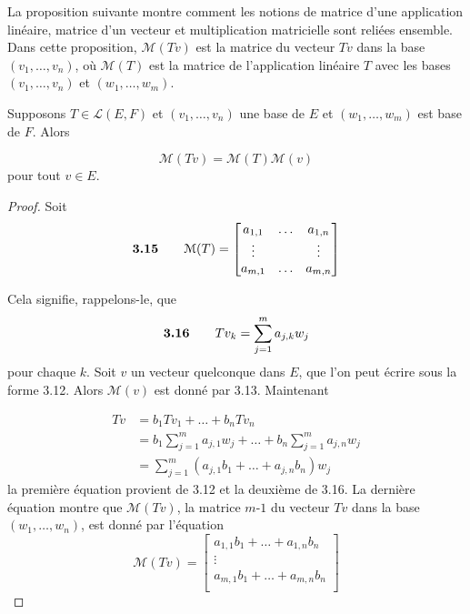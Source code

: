 \documentclass[12pt]{book}
\begin{document}
La proposition suivante montre comment les notions de matrice d'une application linéaire, matrice d'un vecteur et multiplication matricielle sont reliées ensemble. Dans cette proposition, 
$\mathcal{M}(Tv)$ est la matrice du vecteur $Tv$ dans la base $(v_1,\ldots,v_n)$, où $\mathcal{M}(T)$ est la matrice de l'application linéaire $T$ avec les bases $(v_1,\ldots,v_n)$ et $(w_1,\ldots,w_m)$.

\begin{prop}
Supposons $T\in\mathcal{L}(E,F)$ et $(v_1,\ldots,v_n)$ une base de $E$ et $(w_1,\ldots,w_m)$ est base de $F$. Alors

\begin{equation*}
    \mathcal{M}(Tv)=\mathcal{M}(T)\mathcal{M}(v)
\end{equation*}
pour tout $v\in E$.

\begin{proof}
Soit 
\begin{equation*}
    \textrm{\textbf{3.15}} \qquad
    \mathcal{M}(T) 
    =
    \begin{bmatrix}
        a_{1,1} & \ldots & a_{1,n} \\
        \vdots & & \vdots\\
        a_{m,1} & \ldots & a_{m,n} \\
\end{bmatrix}
\end{equation*}

Cela signifie, rappelons-le, que 
\begin{equation*}
    \textrm{\textbf{3.16}} \qquad
    Tv_k
    =
    \sum_{j=1}^ma_{j,k}w_j
\end{equation*}
pour chaque $k$. Soit $v$ un vecteur quelconque dans $E$, que l'on peut écrire sous la  forme 3.12. Alors $\mathcal{M}(v)$ est donné par 3.13. Maintenant 

\begin{equation*}
    \begin{split}
        Tv &= b_1Tv_1 + \ldots + b_nTv_n \\
        & = b_1\sum_{j=1}^ma_{j,1}w_j + \ldots + b_n\sum_{j=1}^ma_{j,n}w_j \\
        & = \sum_{j=1}^m(a_{j,1}b_1+\ldots+a_{j,n}b_n)w_j
    \end{split}
\end{equation*}
la première équation provient de 3.12 et la deuxième de 3.16. La dernière équation montre que $\mathcal{M}(Tv)$, la matrice $m$-$1$ du vecteur $Tv$ dans la base $(w_1,\ldots,w_n)$, est donné par l'équation 
\begin{equation*}
    \mathcal{M}(Tv)=
    \begin{bmatrix}
        a_{1,1}b_1 + \ldots + a_{1,n}b_n \\
        \vdots \\
        a_{m,1}b_1 + \ldots + a_{m,n}b_n \\
    \end{bmatrix}
\end{equation*}


\end{proof}
\end{prop}
\end{document}

